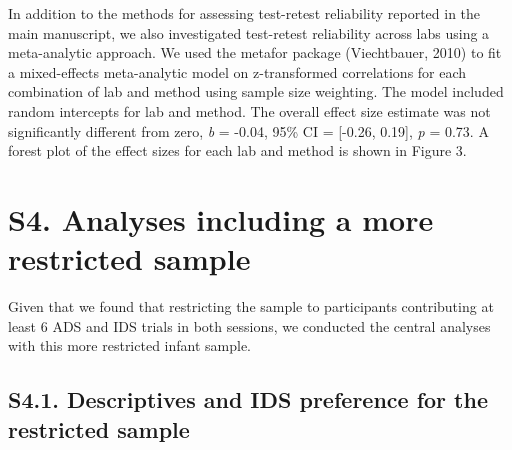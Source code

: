 \documentclass[
  man, donotrepeattitle,floatsintext]{apa6}
\begin{document}
In addition to the methods for assessing test-retest reliability reported in the main manuscript, we also investigated test-retest reliability across labs using a meta-analytic approach.
We used the metafor package (Viechtbauer, 2010) to fit a mixed-effects meta-analytic model on z-transformed correlations for each combination of lab and method using sample size weighting.
The model included random intercepts for lab and method.
The overall effect size estimate was not significantly different from zero, \emph{b} = -0.04, 95\% CI = {[}-0.26, 0.19{]}, \emph{p} = 0.73.
A forest plot of the effect sizes for each lab and method is shown in Figure 3.

\hypertarget{s4.-analyses-including-a-more-restricted-sample}{%
\section{S4. Analyses including a more restricted sample}\label{s4.-analyses-including-a-more-restricted-sample}}

Given that we found that restricting the sample to participants contributing at least 6 ADS and IDS trials in both sessions, we conducted the central analyses with this more restricted infant sample.

\hypertarget{s4.1.-descriptives-and-ids-preference-for-the-restricted-sample}{%
\subsection{S4.1. Descriptives and IDS preference for the restricted sample}\label{s4.1.-descriptives-and-ids-preference-for-the-restricted-sample}}
\end{document}
